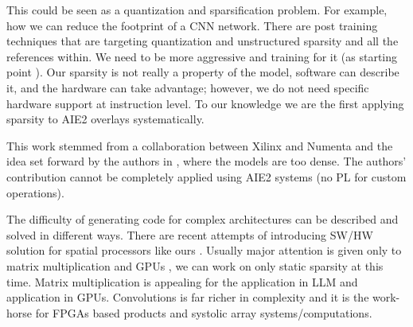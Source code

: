 \documentclass{IEEEtran}
\begin{document}
This could be seen as a quantization and sparsification problem. For
example, how we can reduce the footprint of a CNN network. There are
post training techniques that are targeting quantization and
unstructured sparsity \cite{frantar2023gptq} and all the references
within. We need to be more aggressive and training for it (as starting
point \cite{abs-2102-11289}).  Our sparsity is not really a property
of the model, software can describe it, and the hardware can take
advantage; however, we do not need specific hardware support at
instruction level. To our knowledge we are the first applying sparsity
to AIE2 overlays systematically.

This work stemmed from a collaboration between Xilinx and Numenta and
the idea set forward by the authors in \cite{ahmad2019dense}, where
the models are too dense. The authors' contribution cannot be
completely applied using AIE2 systems (no PL for custom operations).


The difficulty of generating code for complex architectures can be
described and solved in different ways. There are recent attempts of
introducing SW/HW solution for spatial processors like ours
\cite{Huang2021CoSASB,Russo2023MemoryAwareDA,Cai2023InterlayerSS}.
Usually major attention is given only to matrix multiplication and
GPUs \cite{Gray2017GPUKF} \cite{li2023popsparse}, we can work on only
static sparsity at this time. Matrix multiplication is appealing for
the application in LLM and application in GPUs. Convolutions is far
richer in complexity and it is the work-horse for FPGAs based products
and systolic array systems/computations.










\end{document}
